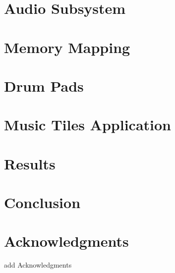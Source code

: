 \documentclass[10pt, letterpaper]{IEEEconf}
\begin{document}
  \section{Audio Subsystem}
  

  \section{Memory Mapping}
  

  \section{Drum Pads}
  

  \section{Music Tiles Application}
  

  \section{Results}
  

  \section{Conclusion}
  

  \section*{Acknowledgments}
  add Acknowledgments

  \cite{TestResource}

  \printbibliography
  
\end{document}
